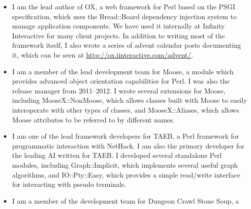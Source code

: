 \documentclass[letterpaper]{article}
\begin{document}
\pagebreak
{}
\begin{itemize}
    \item {} \vspace{6pt} \linebreak
        I am the lead author of OX, a web framework for Perl based on the PSGI
        specification, which uses the Bread::Board dependency injection system
        to manage application components. We have used it internally at
        Infinity Interactive for many client projects. In addition to writing
        most of the framework itself, I also wrote a series of advent calendar
        posts documenting it, which can be seen at
        \url{http://ox.iinteractive.com/advent/}.
    \item {} \vspace{6pt} \linebreak
        I am a member of the lead development team for Moose, a module which
        provides advanced object orientation capabilities for Perl. I was also
        the release manager from 2011--2012. I wrote several extensions for
        Moose, including MooseX::NonMoose, which allows classes built with
        Moose to easily interoperate with other types of classes, and
        MooseX::Aliases, which allows Moose attributes to be referred to by
        different names.
    \item {} \vspace{6pt} \linebreak
        I am one of the lead framework developers for TAEB, a Perl framework
        for programmatic interaction with NetHack. I am also the primary
        developer for the leading AI written for TAEB. I developed several
        standalone Perl modules, including Graph::Implicit, which implements
        several useful graph algorithms, and IO::Pty::Easy, which provides a
        simple read/write interface for interacting with pseudo terminals.
    \item {} \vspace{6pt} \linebreak
        I am a member of the development team for Dungeon Crawl Stone Soup, a

\end{itemize}
\end{document}
